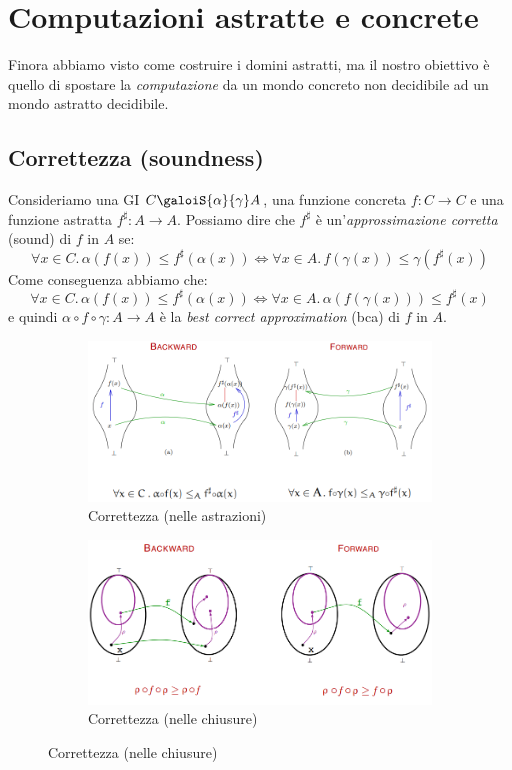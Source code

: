 \documentclass[a4paper,oneside,titlepage]{book}
\begin{document}
\section{Computazioni astratte e concrete} %
Finora abbiamo visto come costruire i domini astratti, ma il nostro obiettivo è quello di spostare la \textit{computazione} da un mondo concreto non decidibile ad un mondo astratto decidibile.

\subsection{Correttezza (soundness)}
Consideriamo una GI $C \galoiS{\alpha}{\gamma} A$, una funzione concreta $f: C \rightarrow C$ e una funzione astratta $f^{\sharp}: A \rightarrow A$. Possiamo dire che $f^{\sharp}$ è un'\textit{approssimazione corretta} (sound) di $f$ in $A$ se:
\[
	\forall x \in C. \, \alpha(f(x)) \leq f^{\sharp}(\alpha(x))
    \Leftrightarrow
	\forall x \in A. \, f(\gamma(x)) \leq \gamma(f^{\sharp}(x))
\]
Come conseguenza abbiamo che:
\[
	\forall x \in C. \, \alpha(f(x)) \leq f^{\sharp}(\alpha(x))
    \Leftrightarrow
	\forall x \in A. \, \alpha(f(\gamma(x))) \leq f^{\sharp}(x)
\]
e quindi $\alpha \circ f \circ \gamma: A \rightarrow A$ è la \textit{best correct approximation} (bca) di $f$ in $A$.
\begin{figure}[htp]
	\begin{subfigure}{0.49\textwidth}
	    \centering
		\includegraphics[width=\textwidth, height=\textheight, keepaspectratio]{sound1.png}
		\caption{Correttezza (nelle astrazioni)}
	\end{subfigure}
	\hfill
	\begin{subfigure}{0.49\textwidth}
	    \centering
		\includegraphics[width=\textwidth, height=\textheight, keepaspectratio]{sound2.png} 
		\caption{Correttezza (nelle chiusure)}
	\end{subfigure}
\end{figure}
\end{document}
